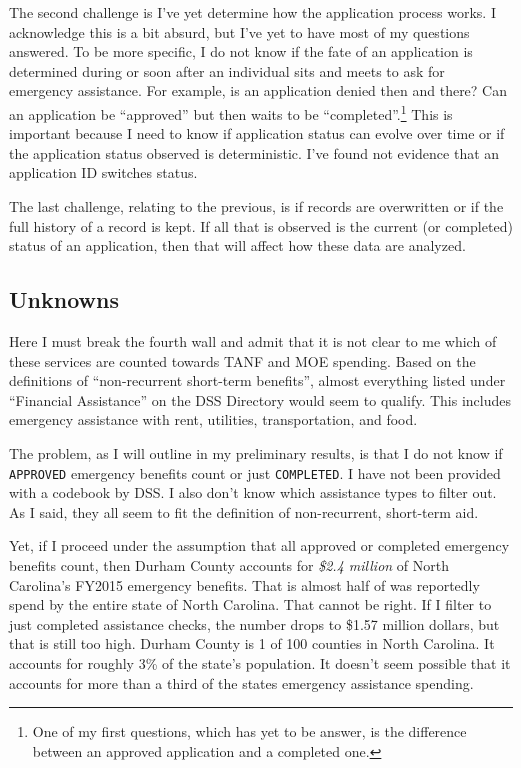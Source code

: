 \documentclass[12pt,letterpaperpaper,]{book}
\begin{document}
The second challenge is I've yet determine how the application process
works. I acknowledge this is a bit absurd, but I've yet to have most of
my questions answered. To be more specific, I do not know if the fate of
an application is determined during or soon after an individual sits and
meets to ask for emergency assistance. For example, is an application
denied then and there? Can an application be ``approved'' but then waits
to be ``completed''.\footnote{One of my first questions, which has yet
  to be answer, is the difference between an approved application and a
  completed one.} This is important because I need to know if
application status can evolve over time or if the application status
observed is deterministic. I've found not evidence that an application
ID switches status.

The last challenge, relating to the previous, is if records are
overwritten or if the full history of a record is kept. If all that is
observed is the current (or completed) status of an application, then
that will affect how these data are analyzed.

\subsection{Unknowns}\label{unknowns}

Here I must break the fourth wall and admit that it is not clear to me
which of these services are counted towards TANF and MOE spending. Based
on the definitions of ``non-recurrent short-term benefits'', almost
everything listed under ``Financial Assistance'' on the DSS Directory
would seem to qualify. This includes emergency assistance with rent,
utilities, transportation, and food.

The problem, as I will outline in my preliminary results, is that I do
not know if \texttt{APPROVED} emergency benefits count or just
\texttt{COMPLETED}. I have not been provided with a codebook by DSS. I
also don't know which assistance types to filter out. As I said, they
all seem to fit the definition of non-recurrent, short-term aid.

Yet, if I proceed under the assumption that all approved or completed
emergency benefits count, then Durham County accounts for \emph{\$2.4
million} of North Carolina's FY2015 emergency benefits. That is almost
half of was reportedly spend by the entire state of North Carolina. That
cannot be right. If I filter to just completed assistance checks, the
number drops to \$1.57 million dollars, but that is still too high.
Durham County is 1 of 100 counties in North Carolina. It accounts for
roughly 3\% of the state's population. It doesn't seem possible that it
accounts for more than a third of the states emergency assistance
spending.
\end{document}
